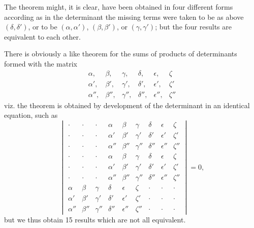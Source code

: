\documentclass[12pt,a4paper]{article}
\theoremstyle{cayley}
\theoremstyle{definition}
\numberwithin{equation}{section}
\begin{document}
The theorem might, it is clear, have been obtained in four different forms according as in the determinant the missing terms were taken to be as above $(\delta, \delta')$, or to be $(\alpha, \alpha')$, $(\beta, \beta')$, or $(\gamma, \gamma')$; but the four results are equivalent to each other.

There is obviously a like theorem for the sums of products of determinants formed with the matrix
\[
\begin{matrix}
\alpha, & \beta, & \gamma, & \delta, & \epsilon, & \zeta \\
\alpha', & \beta', & \gamma', & \delta', & \epsilon', & \zeta' \\
\alpha'', & \beta'', & \gamma'', & \delta'', & \epsilon'', & \zeta''
\end{matrix}
\]
viz. the theorem is obtained by development of the determinant in an identical equation, such as
\[
\begin{vmatrix}
\cdot & \cdot & \cdot & \alpha & \beta & \gamma & \delta & \epsilon & \zeta \\
\cdot & \cdot & \cdot & \alpha' & \beta' & \gamma' & \delta' & \epsilon' & \zeta' \\
\cdot & \cdot & \cdot & \alpha'' & \beta'' & \gamma'' & \delta'' & \epsilon'' & \zeta'' \\
\cdot & \cdot & \cdot & \alpha & \beta & \gamma & \delta & \epsilon & \zeta \\
\cdot & \cdot & \cdot & \alpha' & \beta' & \gamma' & \delta' & \epsilon' & \zeta' \\
\cdot & \cdot & \cdot & \alpha'' & \beta'' & \gamma'' & \delta'' & \epsilon'' & \zeta'' \\
\alpha & \beta & \gamma & \delta & \epsilon & \zeta & \cdot & \cdot & \cdot \\
\alpha' & \beta' & \gamma' & \delta' & \epsilon' & \zeta' & \cdot & \cdot & \cdot \\
\alpha'' & \beta'' & \gamma'' & \delta'' & \epsilon'' & \zeta'' & \cdot & \cdot & \cdot
\end{vmatrix} = 0,
\]
but we thus obtain 15 results which are not all equivalent.
\end{document}
